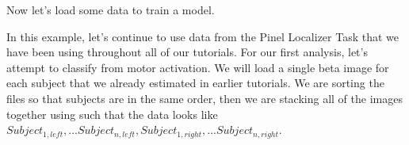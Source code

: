 \documentclass[letterpaper,10pt,english]{sphinxmanual}
\begin{document}
Now let’s load some data to train a model.

In this example, let’s continue to use data from the Pinel Localizer Task that we have been using throughout all of our tutorials. For our first analysis, let’s attempt to classify  from  motor activation. We will load a single beta image for each subject that we already estimated in earlier tutorials. We are sorting the files so that subjects are in the same order, then we are stacking all of the images together using  such that the data looks like \(Subject_{1, left}, ... Subject_{n, left}, Subject_{1, right}, ... Subject_{n, right}\).

\begin{sphinxVerbatim}[commandchars=\\\{\}]
    
  

    
  

  
\end{sphinxVerbatim}
\end{document}
